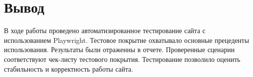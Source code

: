\section{Вывод}
В ходе работы проведено автоматизированное тестирование сайта с использованием Playwright.
Тестовое покрытие охватывало основные прецеденты использования.
Результаты были отраженны в отчете.
Проверенные сценарии соответствуют чек-листу тестового покрытия.
Тестирование позволило оценить стабильность и корректность работы сайта.